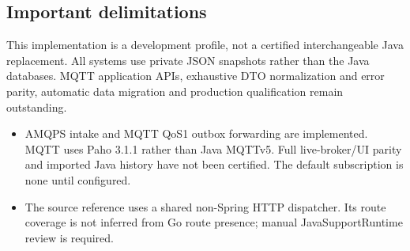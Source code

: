 \documentclass[a4paper]{arrowhead}
\begin{document}
\subsection{Important delimitations}
This implementation is a development profile, not a certified interchangeable Java replacement. All systems use private JSON snapshots rather than the Java databases. MQTT application APIs, exhaustive DTO normalization and error parity, automatic data migration and production qualification remain outstanding.
\begin{itemize}
\item AMQPS intake and MQTT QoS1 outbox forwarding are implemented. MQTT uses Paho 3.1.1 rather than Java MQTTv5. Full live-broker/UI parity and imported Java history have not been certified. The default subscription is none until configured.
\item The source reference uses a shared non-Spring HTTP dispatcher. Its route coverage is not inferred from Go route presence; manual JavaSupportRuntime review is required.
\end{itemize}
\end{document}
